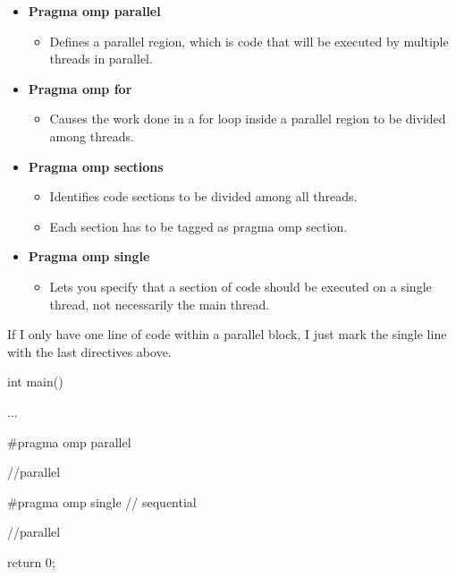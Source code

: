 \begin{itemize}
    \item \textbf{Pragma omp parallel } 
    \begin{itemize}
        \item[] Defines a parallel region, which is code that will be executed by multiple threads in parallel.
    \end{itemize}

    \item \textbf{Pragma omp for } 
    \begin{itemize}
        \item[] Causes the work done in a for loop inside a parallel region to be divided among threads.
    \end{itemize}

    \item \textbf{Pragma omp sections } 
    \begin{itemize}
        \item[] Identifies code sections to be divided among all threads.
        \item[] Each section has to be tagged as pragma omp section.
    \end{itemize}

    \item \textbf{Pragma omp single } 
    \begin{itemize}
        \item[] Lets you specify that a section of code should be executed on a single thread, not necessarily the main thread.
    \end{itemize}
\end{itemize}

If I only have one line of code within a parallel block, I just mark the single line with the last directives above.

\begin{codeInC}

int main(){

    ...

    #pragma omp parallel
    {

        //parallel

        #pragma omp single
        {
            // sequential
        }
        
        //parallel
    
    }

    return 0;
}
    
\end{codeInC}



